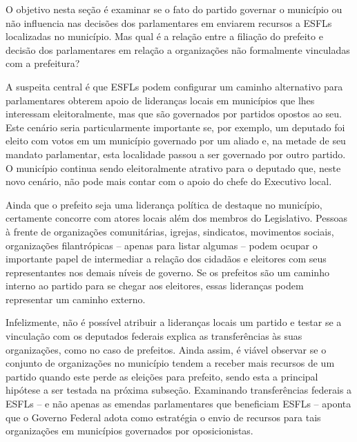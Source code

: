 O objetivo nesta seção é examinar se o fato do partido governar o município ou não influencia nas decisões dos parlamentares em enviarem recursos a ESFLs localizadas no município. Mas qual é a relação entre a filiação do prefeito e decisão dos parlamentares em relação a organizações não formalmente vinculadas com a prefeitura?

A suspeita central é que ESFLs podem configurar um caminho alternativo para parlamentares obterem apoio de lideranças locais em municípios que lhes interessam eleitoralmente, mas que são governados por partidos opostos ao seu. Este cenário seria particularmente importante se, por exemplo, um deputado foi eleito com votos em um município governado por um aliado e, na metade de seu mandato parlamentar, esta localidade passou a ser governado por outro partido. O município continua sendo eleitoralmente atrativo para o deputado que, neste novo cenário, não pode mais contar com o apoio do chefe do Executivo local.  

Ainda que o prefeito seja uma liderança política de destaque no município, certamente concorre com atores locais além dos membros do Legislativo. Pessoas à frente de organizações comunitárias, igrejas, sindicatos, movimentos sociais, organizações filantrópicas -- apenas para listar algumas -- podem ocupar o importante papel de intermediar a relação dos cidadãos e eleitores com seus representantes nos demais níveis de governo. Se os prefeitos são um caminho interno ao partido para se chegar aos eleitores, essas lideranças podem representar um caminho externo.

Infelizmente, não é possível atribuir a lideranças locais um partido e testar se a vinculação com os deputados federais explica as transferências às suas organizações, como no caso de prefeitos. Ainda assim, é viável observar se o conjunto de organizações no município tendem a receber mais recursos de um partido quando este perde as eleições para prefeito, sendo esta a principal hipótese a ser testada na próxima subseção. Examinando transferências federais a ESFLs -- e não apenas as emendas parlamentares que beneficiam ESFLs -- \citet{Bueno2014} aponta que o Governo Federal adota como estratégia o envio de recursos para tais organizações em municípios governados por oposicionistas.

